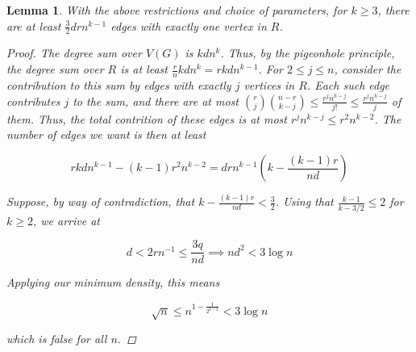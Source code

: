 \documentclass[12pt]{article}
\newtheorem{lemma}[thm]{Lemma}
\begin{document}
    \begin{lemma}
        With the above restrictions and choice of parameters, \color{red} for $k \geq 3$, \color{black}
        there are at least $\frac{3}{2}drn^{k-1}$
        edges with exactly one vertex in $R$.

        \begin{proof}

            The degree sum over $V(G)$ is $kdn^{k}$.
            Thus, by the pigeonhole principle, the degree sum over $R$ is at least
            $\frac{r}{n}kdn^{k} = rkdn^{k-1}$.
            For $2 \leq j \leq n$, consider the contribution to this sum by edges with exactly $j$ vertices in $R$.
            Each such edge contributes $j$ to the sum, and there are at most
            $\binom{r}{j}\binom{n-r}{k-j} \leq \frac{r^j n^{k-j}}{j!} \leq \frac{r^j n^{k-j}}{j}$ of them.
            Thus, the total contrition of these edges is at most $r^j n^{k-j} \leq r^{2}n^{k-2}$.
            The number of edges we want is then at least

            \[
                rkdn^{k-1} - (k-1)r^{2}n^{k-2} = drn^{k-1} \left( k - \frac{(k-1)r}{nd}\right)
            \]
            
            Suppose, by way of contradiction,
            that $ k - \frac{(k-1)r}{nd} < \frac{3}{2}$.
            Using that $\frac{k-1}{k-3/2} \leq 2$
            for $k \geq 2$, we arrive at

            \[
                d < 2rn^{-1} \leq \frac{3q}{nd} \implies nd^2 < 3 \log n
            \]
            
            Applying our minimum density, this means
            
            \[
                \sqrt {n} \leq n^{1 - \frac{1}{2^{k-2}}} < 3 \log n
            \]

            which is false for all $n$.
        \end{proof}
    \end{lemma}
\end{document}
